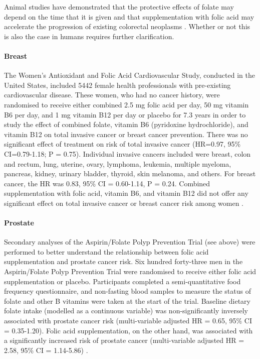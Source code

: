 \noindent Animal studies have demonstrated that the protective effects of folate may depend on the time that it is given and that supplementation with folic acid may accelerate the progression of existing colorectal neoplasms \cite{c240,c241}. Whether or not this is also the case in humans requires further clarification. 

\vspace{-0.4cm}
\paragraph{Breast} %
The Women's Antioxidant and Folic Acid Cardiovascular Study, conducted in the United States, included 5442 female health professionals with pre-existing cardiovascular disease. These women, who had no cancer history, were randomised to receive either combined 2.5 mg folic acid per day, 50 mg vitamin B6 per day, and 1 mg vitamin B12 per day or placebo for 7.3 years in order to study the effect of combined folate, vitamin B6 (pyridoxine hydrochloride), and vitamin B12 on total invasive cancer or breast cancer prevention. There was no significant effect of treatment on risk of total invasive cancer (HR=0.97, 95\% CI=0.79-1.18; P = 0.75). Individual invasive cancers included were breast, colon and rectum, lung, uterine, ovary, lymphoma, leukemia, multiple myeloma, pancreas, kidney, urinary bladder, thyroid, skin melanoma, and others. For breast cancer, the HR was 0.83, 95\% CI = 0.60-1.14, P = 0.24. Combined supplementation with folic acid, vitamin B6, and vitamin B12 did not offer any significant effect on total invasive cancer or breast cancer risk among women \cite{c242}. 

\vspace{-0.4cm}
\paragraph{Prostate} %
Secondary analyses of the Aspirin/Folate Polyp Prevention Trial (see above) were performed to better understand the relationship between folic acid supplementation and prostate cancer risk. Six hundred forty-three men in the Aspirin/Folate Polyp Prevention Trial were randomised to receive either folic acid supplementation or placebo. Participants completed a semi-quantitative food frequency questionnaire, and non-fasting blood samples to measure the status of folate and other B vitamins were taken at the start of the trial. Baseline dietary folate intake (modelled as a continuous variable) was non-significantly inversely associated with prostate cancer risk (multi-variable adjusted HR = 0.65, 95\% CI = 0.35-1.20). Folic acid supplementation, on the other hand, was associated with a significantly increased risk of prostate cancer (multi-variable adjusted HR = 2.58, 95\% CI = 1.14-5.86) \cite{c243}. 
 
